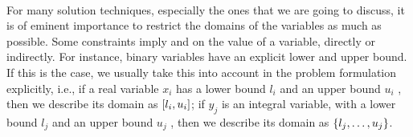 \paragraph{}
For many solution techniques, especially the ones that we are going to discuss, it is of eminent importance to restrict the domains of the variables as much as possible. Some constraints imply  and  on the value of a variable, directly or indirectly. For instance, binary variables have an explicit lower and upper bound. If this is the case, we usually take this into account in the problem formulation explicitly, i.e., if a real variable $x_i$ has a lower bound $l_i$ and an upper bound $u_i$ , then we describe its domain as $\left[ l_i,u_i \right]$; if $y_j$ is an integral variable, with a lower bound $l_j$ and an upper bound $u_j$ , then we describe its domain as $\left\{ l_j,\ldots,u_j \right\}$.

